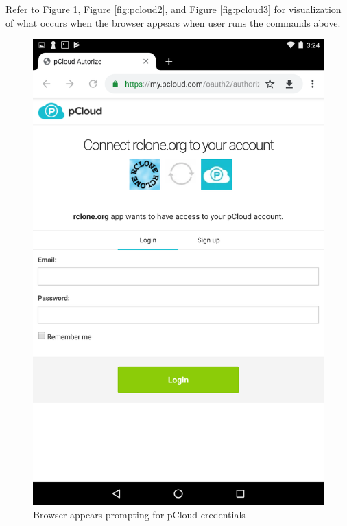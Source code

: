 Refer to Figure \ref{fig:pcloud1}, Figure \ref{fig:pcloud2}, and Figure \ref{fig:pcloud3} for visualization of what occurs when the browser appears when user runs the commands above.
\begin{figure}[htb]
  \centering
  \includegraphics[scale=0.2]{images/pcloud1.png}
  \caption{Browser appears prompting for pCloud credentials}
  \label{fig:pcloud1}
\end{figure}
